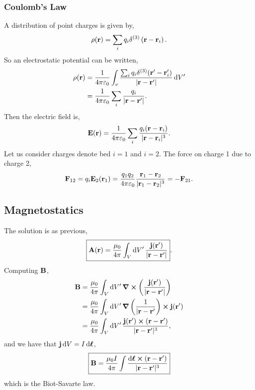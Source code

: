 \documentclass{book}
\begin{document}
\subsubsection{Coulomb's Law}
A distribution of point charges is given by,
\begin{equation}
	\rho(\vb{r}) = \sum_i q_i\delta^{(3)}\left(\vb{r}-\vb{r}_i\right).
\end{equation}
So an electrostatic potential can be written,
\begin{equation}
	\begin{split}
		\rho(\vb{r}) &= \frac{1}{4\pi\varepsilon_0}\int_v\dfrac{\sum_iq_i\delta^{(3)}(\vb{r}' - \vb{r}'_i)}{|\vb{r}-\vb{r}'|} \dd{V'} \\
		& = \frac{1}{4\pi\varepsilon_0}\sum_i \frac{q_i}{|\vb{r}-\vb{r}'|}.
	\end{split}
\end{equation}
Then the electric field is,
\begin{equation}
	\vb{E}(\vb{r}) = \frac{1}{4\pi\varepsilon_0}\sum_i \frac{q_i(\vb{r} -\vb{r}_i)}{|\vb{r}-\vb{r}_i|^3}.
\end{equation}
Let us consider charges denote bed $i=1$ and $i=2$. The force on charge 1 due to charge 2,
\begin{equation}
	\vb{F}_{12} = q_i\vb{E}_2(\vb{r}_1) = \frac{q_1q_2}{4\pi\varepsilon_0}\frac{\vb{r}_1 - \vb{r}_2}{|\vb{r}_1 -\vb{r}_2|^3} = -\vb{F}_{21}.
\end{equation}
\subsection{Magnetostatics}
The solution is as previous,
\begin{equation}
	\boxed{\vb{A}(\vb{r}) = \frac{\mu_0}{4\pi}\int_V\dd{V'}\frac{\vb{j}(\vb{r}')}{|\vb{r}-\vb{r}'|}}.
\end{equation}
Computing $\vb{B}$,
\begin{equation}
	\begin{split}
		\vb{B} &= \frac{\mu_0}{4\pi}\int_V\dd{V'}\curl{\left(\frac{\vb{j}(\vb{r}')}{|\vb{r} - \vb{r}'|}\right)} \\
		& = \frac{\mu_0}{4\pi}\int_V\dd{V'} \grad \left(\frac{1}{|\vb{r} - \vb{r}'}\right)\cross \vb{j}(\vb{r}') \\
		& = \frac{\mu_0}{4\pi}\int_V\dd{V'} \frac{\vb{j}(\vb{r}')\cross(\vb{r} - \vb{r}')}{|\vb{r} - \vb{r}'|^3},
	\end{split}
\end{equation}
and we have that $\vb{j} \dd{V} = I \dd{\vb*{\ell}}$,
\begin{equation}
	\boxed{\vb{B} = \frac{\mu_0 I}{4\pi} \int \frac{\dd{\vb*{\ell}}\cross(\vb{r} - \vb{r}')}{|\vb{r} - \vb{r}'|^3}}
\end{equation}
which is the Biot-Savarte law.
\end{document}
